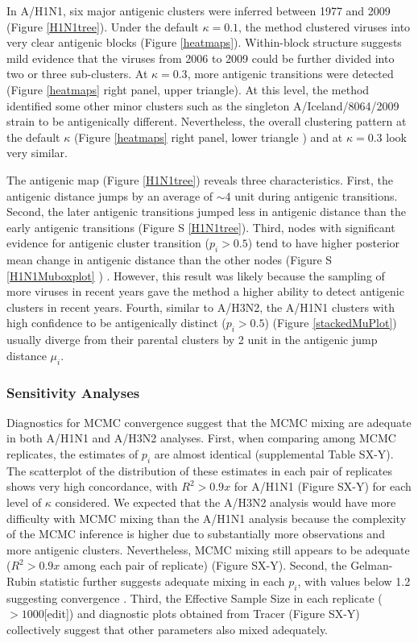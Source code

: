 \documentclass[11pt,oneside,letterpaper]{article}
\begin{document}
In A/H1N1, six major antigenic clusters were inferred between 1977 and 2009 (Figure \ref{H1N1tree}). 
Under the default  $\kappa=0.1$, the method clustered viruses into very clear antigenic blocks  (Figure \ref{heatmaps}). 
Within-block structure suggests mild evidence that the viruses from 2006 to 2009 could be further divided into two or three sub-clusters. 
At $\kappa=0.3$, more antigenic transitions were detected (Figure \ref{heatmaps} right panel, upper triangle).
At this level, the method identified some other minor clusters such as the singleton A/Iceland/8064/2009 strain to be antigenically different.
Nevertheless, the overall clustering pattern at the default $\kappa$ (Figure \ref{heatmaps} right panel, lower triangle ) and at $\kappa=0.3$ look very similar. 

The antigenic map (Figure \ref{H1N1tree}) reveals three characteristics.
First, the antigenic distance jumps by an average of $\sim$4 unit during antigenic transitions. 
Second, the later antigenic transitions jumped less in antigenic distance than the early antigenic transitions (Figure S \ref{H1N1tree}). 
Third, nodes with significant evidence for antigenic cluster transition ($p_i > 0.5$) tend to have higher posterior mean change in antigenic distance than the other nodes (Figure S \ref{H1N1Muboxplot} ) .
However, this result was likely because the sampling of more viruses in recent years gave the method a higher ability to detect antigenic clusters in recent years.
Fourth, similar to A/H3N2, the A/H1N1 clusters with high confidence to be antigenically distinct ($p_i > 0.5$) (Figure \ref{stackedMuPlot}) usually diverge from their parental clusters by 2 unit in the antigenic jump distance $\mu_i$.



\subsubsection*{Sensitivity Analyses}

Diagnostics for MCMC convergence suggest that the MCMC mixing are adequate in both A/H1N1 and A/H3N2 analyses. 
First, when comparing among MCMC replicates, the estimates of $p_i$ are almost identical (supplemental Table SX-Y). 
The scatterplot of the distribution of these estimates in each pair of replicates shows very high concordance, with $R^2 > 0.9x$  for A/H1N1 (Figure SX-Y) for each level of $\kappa$ considered. 
We expected that the A/H3N2 analysis would have more difficulty with MCMC mixing than the A/H1N1 analysis because the complexity of the MCMC inference is higher due to substantially more observations and more antigenic clusters. 
Nevertheless, MCMC mixing still appears to be adequate ($R^2 > 0.9x$ among each pair of replicate) (Figure SX-Y). 
Second, the Gelman-Rubin statistic further suggests adequate mixing in each $p_i$, with values below 1.2  suggesting convergence \cite{Yang_evolutionbook}. 
Third, the Effective Sample Size in each replicate ($>1000$[edit]) and diagnostic plots obtained from Tracer (Figure SX-Y) collectively suggest that other parameters also mixed adequately.
\end{document}
